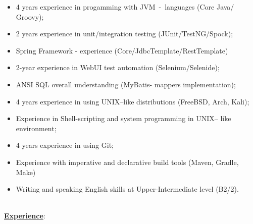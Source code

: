 \documentclass[hidelinks,12pt,a4paper,oneside]{article}
\newcommand*\tqs{\textquotesingle}
\begin{document}
{\large
\begin{itemize}[noitemsep]
	\item 4 years experience in progamming with JVM\ -\ languages (Core \tqs Java\tqs /  \tqs Groovy\tqs);
	\item 2 years experience in unit/integration testing (\tqs JUnit\tqs/\tqs TestNG\tqs/\tqs Spock\tqs);
	\item Spring Framework - experience (Core/JdbcTemplate/RestTemplate)
	\item 2-year experience in WebUI test automation (\tqs Selenium\tqs/\tqs Selenide\tqs);
	\item ANSI SQL overall understanding (\tqs MyBatis\tqs - mappers implementation);
	\item 4 years experience in using \tqs UNIX\tqs --like distributions (\tqs FreeBSD\tqs, \tqs Arch\tqs, \tqs Kali\tqs);
	\item Experience in Shell-scripting and system programming in \tqs UNIX\tqs -- like environment;
	\item 4 years experience in using \tqs Git\tqs;
	\item Experience with imperative and declarative build tools (\tqs Maven\tqs, \tqs Gradle\tqs, \tqs Make\tqs)
	\item Writing and speaking English skills at Upper-Intermediate level (B2/2).
\end{itemize}}
\vspace{-15px}
\ \\
{\Large \underline{\textbf{Experience}}}:
\end{document}
